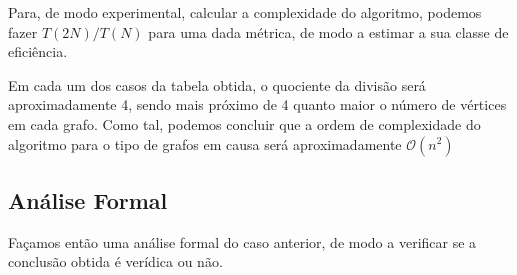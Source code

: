 Para, de modo experimental, calcular a complexidade do algoritmo,
podemos fazer $T(2N) / T(N)$ para uma dada métrica, de modo a
estimar a sua classe de eficiência.

Em cada um dos casos da tabela obtida, o quociente da divisão
será aproximadamente 4, sendo mais próximo de 4 quanto maior o
número de vértices em cada grafo. Como tal, podemos concluir que
a ordem de complexidade do algoritmo para o tipo de grafos em
causa será aproximadamente $\mathcal{O}(n^2)$

\subsection{Análise Formal}

Façamos então uma análise formal do caso anterior, de modo a
verificar se a conclusão obtida é verídica ou não.
